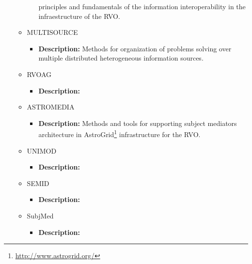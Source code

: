 \documentclass[11pt]{article}
\begin{document}
\begin{itemize}
\begin{itemize}
\begin{itemize}
principles and fundamentals of the information interoperability in the
infraestructure of the RVO.
                               \end{itemize}
                            \item MULTISOURCE
                                \begin{itemize}
                                    \item \textbf{Description:} Methods for
organization of problems solving over multiple distributed he\-te\-ro\-ge\-neous
information sources.
                               \end{itemize}
                            \item RVOAG
                                \begin{itemize}
                                    \item \textbf{Description:}
                                \end{itemize}
                            \item ASTROMEDIA
                                \begin{itemize}
                                    \item \textbf{Description:} Methods and
tools for supporting subject mediators architecture in
AstroGrid\footnote{\url{http://www.astrogrid.org/}} infrastructure for the RVO.
                                \end{itemize}
                            \item UNIMOD
                                \begin{itemize}
                                    \item \textbf{Description:}
                               \end{itemize}
                            \item SEMID
                                \begin{itemize}
                                    \item \textbf{Description:}
                               \end{itemize}
                            \item SubjMed
                                \begin{itemize}
                                    \item \textbf{Description:}
                               \end{itemize}

\end{itemize}
\end{itemize}
\end{document}

